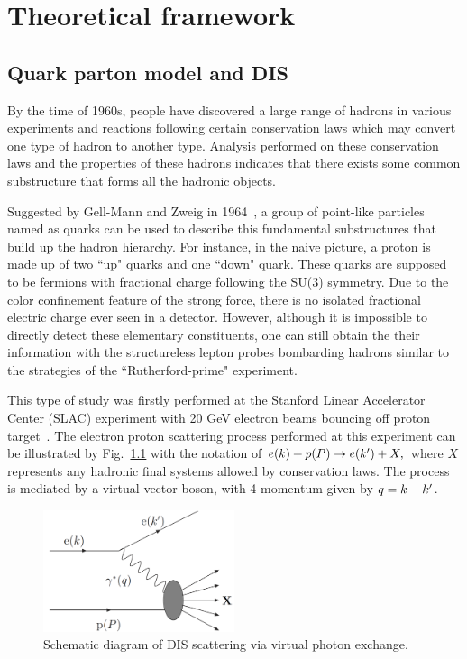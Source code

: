 \chapter{Theoretical framework}
\label{chp:theory}

\section{Quark parton model and DIS}
\label{sec:basicDIS}
By the time of 1960s, people have discovered a large range of hadrons 
in various experiments and reactions following certain conservation laws
which may convert one type of hadron to another type. Analysis performed on these 
conservation laws and the properties of these hadrons indicates that
there exists some common substructure that forms all the hadronic objects.


Suggested by Gell-Mann and Zweig in 1964~\cite{Gell:1964}, a group of point-like particles named
as quarks can be used to describe this fundamental substructures that build up
the hadron hierarchy. For instance, in the naive picture, a proton is made up of
two ``up" quarks and one ``down" quark. These quarks are supposed to be fermions
with fractional charge following the SU(3) symmetry. Due to the color confinement
feature of the strong force, there is no isolated fractional electric charge ever
seen in a detector. However, although it is impossible to directly detect these
elementary constituents, one can still obtain the their information with the
structureless lepton probes bombarding hadrons similar to the strategies of the
``Rutherford-prime" experiment.

This type of study was firstly performed at the Stanford Linear Accelerator
Center (SLAC) experiment with 20 GeV electron beams bouncing off proton
target~\cite{Panofsky:1966gq}. The electron proton scattering process performed
at this experiment can be illustrated by Fig.~\ref{fig:DIS_kinematics} with the
notation of \( e(k)+p(P) \rightarrow e(k^{\prime}) + X, \) where $X$ represents any
hadronic final systems allowed by conservation laws. The process is mediated by
a virtual vector boson, with 4-momentum given by $q=k-k^{\prime}$.

\begin{figure}
\centering
\includegraphics[width=0.5\textwidth]{plots/chpt2/DIS_kinematics.png} 
\caption[The schematic diagram of a DIS process] {
Schematic diagram of DIS scattering via virtual photon exchange.}
\label{fig:DIS_kinematics}
\end{figure}


